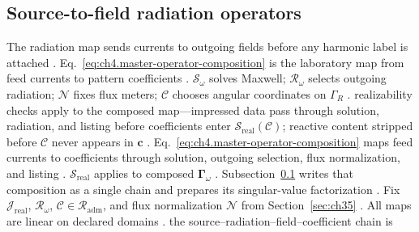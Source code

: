 \subsection{Source-to-field radiation operators}
\label{sec:ch433}
The radiation map sends currents to outgoing fields before any harmonic label is attached \cite{stratton1941}.
Eq.~\eqref{eq:ch4.master-operator-composition} is the laboratory map from feed currents to pattern coefficients \cite{stratton1941}. $\mathcal{S}_\omega$ solves Maxwell; $\mathcal{R}_\omega$ selects outgoing radiation; $\mathcal{N}$ fixes flux meters; $\mathcal{C}$ chooses angular coordinates on $\Gamma_R$ \cite{poynting1884}. realizability checks apply to the composed map---impressed data pass through solution, radiation, and listing before coefficients enter $\mathcal{S}_{\mathrm{real}}(\mathcal{C})$; reactive content stripped before $\mathcal{C}$ never appears in $\mathbf{c}$ \cite{devaney2004}.
Eq.~\eqref{eq:ch4.master-operator-composition} maps feed currents to coefficients through solution, outgoing selection, flux normalization, and listing \cite{stratton1941}. $\mathcal{S}_{\mathrm{real}}$ applies to composed $\boldsymbol{\Gamma}_\omega$ \cite{devaney2004}.
\medskip
 Subsection~\ref{sec:ch433} writes that composition as a single chain and prepares its singular-value factorization \cite{hansen1988}.
Fix \(\mathcal{J}_{\mathrm{real}}\), \(\mathcal{R}_\omega\), \(\mathcal{C}\in\mathcal{R}_{\mathrm{adm}}\), and
flux normalization \(\mathcal{N}\) from Section~\ref{sec:ch35} \cite{stratton1941}. All maps are linear
on declared domains \cite{stratton1941}.
the source--radiation--field--coefficient chain is
